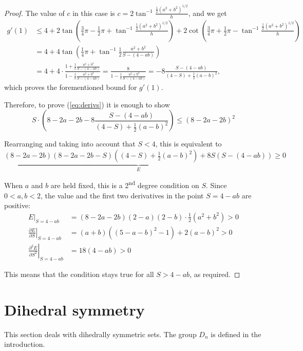 \documentclass[a4paper,10pt,twoside,reqno,intlimits]{amsart}
\begin{document}
\begin{proof}
The value of $c$ in this case is $c = 2 \tan^{-1} \frac{\frac{1}{2}(a^2 + b^2)^{1/2}}{h}$,
and we get
\begin{align*}
g'(1) & \le 4 + 2 \tan \left( \tfrac{3}{4}\pi - \tfrac{1}{2}\pi + \tan^{-1} \frac{\frac{1}{2}(a^2 + b^2)^{1/2}}{h} \right)
                      + 2 \cot \left( \tfrac{3}{4}\pi + \tfrac{1}{2}\pi - \tan^{-1} \frac{\frac{1}{2}(a^2 + b^2)^{1/2}}{h} \right) \\
& = 4 + 4 \tan \left( \tfrac{1}{4}\pi + \tan^{-1} \frac{1}{2} \frac{a^2 + b^2}{S - (4 - ab)} \right) \\
& = 4 + 4 \cdot \frac{ 1 + \frac{1}{2} \frac{a^2 + b^2}{S - (4 - ab)} }
                                { 1 - \frac{1}{2} \frac{a^2 + b^2}{S - (4 - ab)} }
   = \frac{8}{1 - \frac{1}{2} \frac{a^2 + b^2}{S - (4 - ab)}}
   = -8 \frac{ S - (4 - ab) } { (4 - S) + \frac{1}{2} (a-b)^2 } ,
\end{align*}
which proves the forementioned bound for $g'(1)$.

Therefore, to prove (\ref{eq:derivs}) it is enough to show
$$ S \cdot \left( 8 - 2a - 2b -8 \frac{ S - (4 - ab) } { (4 - S) + \frac{1}{2} (a-b)^2 } \right) \le (8 - 2a - 2b)^2 $$

Rearranging and taking into account that $S < 4$, this is equivalent to
$$ \underbrace{ (8 - 2a - 2b)(8 - 2a - 2b - S)\left( (4 - S) + \tfrac{1}{2} (a-b)^2 \right) + 8S(S - (4 - ab)) }_E \ge 0 $$

When $a$ and $b$ are held fixed, this is a 2\textsuperscript{nd} degree condition on $S$.
Since ${0 < a, b < 2}$, the value and the first two derivatives in the point $S = 4 - ab$ are positive:
\begin{align*}
E |_{S=4-ab} & = (8 - 2a - 2b)(2-a)(2-b)\cdot\tfrac{1}{2}(a^2+b^2) > 0 \\
\left. \frac{\partial E}{\partial S} \right|_{S=4-ab} & = (a+b) \left( (5 - a - b)^2 - 1 \right) + 2(a-b)^2 > 0 \\
\left. \frac{\partial^2 E}{\partial S^2} \right|_{S=4-ab} & = 18(4 - ab) > 0
\end{align*}

This means that the condition stays true for all $S > 4 - ab$, as required.
\end{proof}

\section{Dihedral symmetry}
\label{sec:dihedral}

This section deals with dihedrally symmetric sets.
The group $D_n$ is defined in the introduction.
\end{document}
